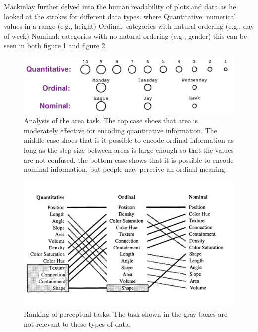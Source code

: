 \begin{flushleft}
Mackinlay further delved into the human readability of plots and data as he looked at the strokes for different data types. where Quantitative: numerical values in a range (e.g., height) Ordinal: categories with natural ordering (e.g., day of week) Nominal: categories with no natural ordering (e.g., gender) this can be seen in both figure \ref{fig:data_types_1} and figure \ref{fig:data_types_2}
\end{flushleft}
\begin{figure}[h]
    \centering
    \includegraphics[width=.75\textwidth]{figures/data_types_1.png}
    \caption{Analysis of the area task. The top case shoes that area is moderately effective for encoding quantitative information. The middle case shoes that is it possible to encode ordinal information as long as the step size between areas is large enough so that the values are not confused. the bottom case shows that it is possible to encode nominal information, but people may perceive an ordinal meaning.}
    \label{fig:data_types_1}
\end{figure}
\begin{figure}[h]
    \centering
    \includegraphics[width=.75\textwidth]{figures/data_types_2.png}
    \caption{Ranking of perceptual tasks. The task shown in the gray boxes are not relevant to these types of data.}
    \label{fig:data_types_2}
\end{figure}


